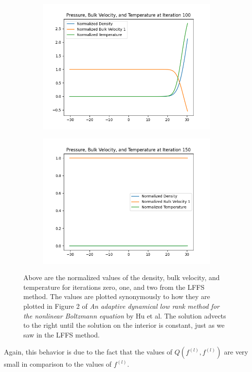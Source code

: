 \documentclass{article}
\begin{document}
\begin{figure}[H]
    \vspace{1em} %
    
    \begin{subfigure}[b]{0.45\textwidth}
    \includegraphics[width=\textwidth]{imgs/time_stepping/iter100.png}
        \label{fig:image3}
    \end{subfigure}
    \hfill
    \begin{subfigure}[b]{0.45\textwidth}
    \includegraphics[width=\textwidth]{imgs/time_stepping/iter150.png}
        \label{fig:image4}
    \end{subfigure}
    
    \caption{Above are the normalized values of the density, bulk velocity, and temperature for iterations zero, one, and two from the LFFS method. The values are plotted synonymously to how they are plotted in Figure 2 of \textit{An adaptive dynamical low rank method for the nonlinear Boltzmann equation} by Hu et al. The solution advects to the right until the solution on the interior is constant, just as we saw in the LFFS method.}
    \label{fig:four_images}
\end{figure}
Again, this behavior is due to the fact that the values of $Q(f^{(l)}, f^{(l)})$ are very small in comparison to the values of $f^{(l)}$.
\end{document}
